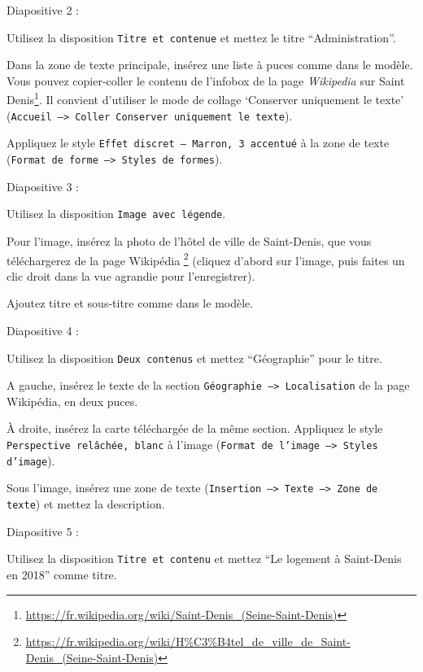 \begin{questions}
\question Diapositive 2 : 
\begin{parts}
\item 
Utilisez la disposition \texttt{Titre et contenue} et mettez le titre
``Administration''. 
\item Dans la zone de texte principale, insérez une liste à
puces comme dans le modèle. Vous pouvez copier-coller le contenu de l'infobox de
la page \emph{Wikipedia} sur Saint
Denis\footnote{\url{https://fr.wikipedia.org/wiki/Saint-Denis_(Seine-Saint-Denis)}}.
Il convient d'utiliser le mode de collage `Conserver uniquement le texte'
(\texttt{Accueil --> Coller Conserver uniquement le texte}).
\item
Appliquez le style \texttt{Effet discret -- Marron, 3 accentué} à la zone de
texte (\texttt{Format de forme --> Styles de formes}).
\end{parts}
\question Diapositive 3 :
\begin{parts}
\item
Utilisez la disposition \texttt{Image avec légende}. 
\item Pour l'image, insérez
la photo de l'hôtel de ville de Saint-Denis, que vous téléchargerez de la page
Wikipédia%
\footnote{\url{https://fr.wikipedia.org/wiki/H\%C3\%B4tel_de_ville_de_Saint-Denis_(Seine-Saint-Denis)}}
(cliquez d'abord sur l'image, puis faites un clic droit dans la vue agrandie
pour l'enregistrer).
\item Ajoutez titre et sous-titre comme dans le modèle.
\end{parts}
\question Diapositive 4 :
\begin{parts}
\item Utilisez la disposition \texttt{Deux contenus} et mettez ``Géographie''
pour le titre. 
\item A gauche, insérez le texte de la section \texttt{Géographie -->
Localisation} de la page Wikipédia, en deux puces. 
\item À droite, insérez la carte téléchargée de la même section. Appliquez le
style \texttt{Perspective relâchée, blanc} à l'image (\texttt{Format de l'image
--> Styles d'image}). 
\item Sous l'image, insérez une zone de texte (\texttt{Insertion --> Texte -->
Zone de texte}) et mettez la description.
\end{parts}
\question Diapositive 5 : 
\begin{parts}
\item Utilisez la disposition \texttt{Titre et contenu} et mettez ``Le
logement à Saint-Denis en 2018'' comme titre.

\end{parts}
\end{questions}
